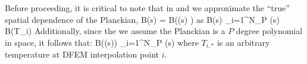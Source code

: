 Before proceeding, it is critical to note that in  and  we approximate the ``true'' spatial dependence of the Planckian, 
\benum
B(s) = B((s) ) \pec
\eenum
as
\benum
B(s) \approx \sum_{i=1}^{N_P}{ (s) B(T_i) } \pep
\eenum
Additionally, since the we assume the Planckian is a $P$ degree polynomial in space, it follows that:
\benum
B((s)) \approx \sum_{i=1}^{N_P}{ (s) \left[ B(T_{i,*}) + (T_i - T_{i,*} ) \frac{d B}{d T} \bigg \lvert_{T = T_{i,*}}\right] } \pec 
\eenum
where $T_{i,*}$ is an arbitrary temperature at DFEM interpolation point $i$.

%
